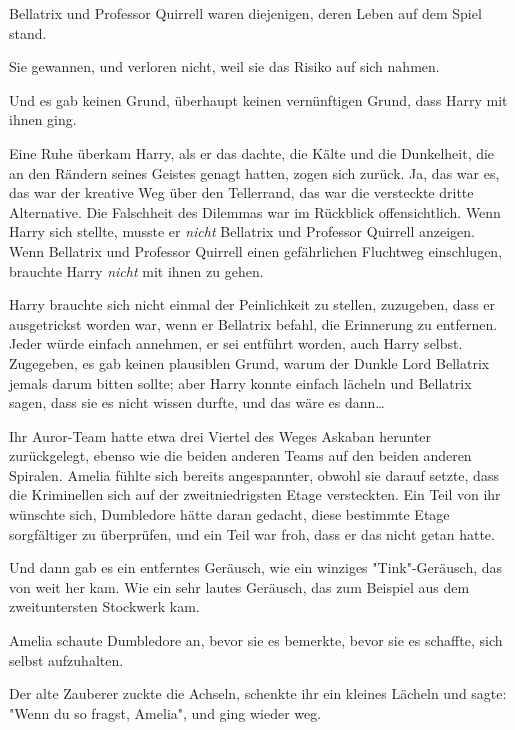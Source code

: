 {Bellatrix und Professor Quirrell waren diejenigen, deren Leben auf dem Spiel stand.

Sie gewannen, und verloren nicht, weil sie das Risiko auf sich nahmen.

Und es gab keinen Grund, überhaupt keinen vernünftigen Grund, dass Harry mit ihnen ging.

Eine Ruhe überkam Harry, als er das dachte, die Kälte und die Dunkelheit, die an den Rändern seines Geistes genagt hatten, zogen sich zurück. Ja, das war es, das war der kreative Weg über den Tellerrand, das war die versteckte dritte Alternative. Die Falschheit des Dilemmas war im Rückblick offensichtlich. Wenn Harry sich stellte, musste er \emph{nicht} Bellatrix und Professor Quirrell anzeigen. Wenn Bellatrix und Professor Quirrell einen gefährlichen Fluchtweg einschlugen, brauchte Harry \emph{nicht} mit ihnen zu gehen.

Harry brauchte sich nicht einmal der Peinlichkeit zu stellen, zuzugeben, dass er ausgetrickst worden war, wenn er Bellatrix befahl, die Erinnerung zu entfernen. Jeder würde einfach annehmen, er sei entführt worden, auch Harry selbst. Zugegeben, es gab keinen plausiblen Grund, warum der Dunkle Lord Bellatrix jemals darum bitten sollte; aber Harry konnte einfach lächeln und Bellatrix sagen, dass sie es nicht wissen durfte, und das wäre es dann…

Ihr Auror-Team hatte etwa drei Viertel des Weges Askaban herunter zurückgelegt, ebenso wie die beiden anderen Teams auf den beiden anderen Spiralen. Amelia fühlte sich bereits angespannter, obwohl sie darauf setzte, dass die Kriminellen sich auf der zweitniedrigsten Etage versteckten. Ein Teil von ihr wünschte sich, Dumbledore hätte daran gedacht, diese bestimmte Etage sorgfältiger zu überprüfen, und ein Teil war froh, dass er das nicht getan hatte.

Und dann gab es ein entferntes Geräusch, wie ein winziges "Tink"-Geräusch, das von weit her kam. Wie ein sehr lautes Geräusch, das zum Beispiel aus dem zweituntersten Stockwerk kam.

Amelia schaute Dumbledore an, bevor sie es bemerkte, bevor sie es schaffte, sich selbst aufzuhalten.

Der alte Zauberer zuckte die Achseln, schenkte ihr ein kleines Lächeln und sagte: "Wenn du so fragst, Amelia", und ging wieder weg.

}
